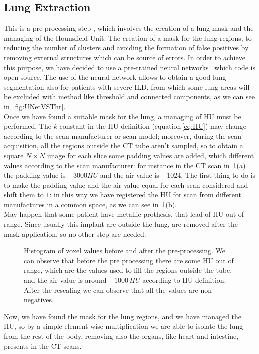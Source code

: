 \documentclass{standalone}
\begin{document}
	\subsection{Lung Extraction}
	This is a pre-processing step , which involves the creation of a lung mask and the managing of the Hounsfield Unit. The creation of a mask for the lung regions, to reducing the number of clusters and avoiding the formation of false positives by removing external structures which can be source of errors. In order to achieve this purpose, we have decided to use a pre-trained neural networks~\cite{REP:lungmask} which code is open source. The use of the neural network allows to obtain a good lung segmentation also for patients with severe ILD, from which some lung areas will be excluded with method like threshold and connected components, as we can see in \figurename\,\ref{fig:UNetVSThr}.\\
	
	Once we have found a suitable mask for the lung, a managing of HU must be performed. The $k$ constant in the HU definition (equation\,\ref{eq:HU}) may change according to the scan manufacturer or scan model; moreover, during the scan acquisition, all the regions outside the CT tube aren't sampled, so to obtain a square $N\times N$ image for each slice some padding values are added, which different values according to the scan manufacturer: for instance in the CT scan in \figurename\,\ref{fig:Pre-Processing}(a) the padding value is $-3000 HU$ and the air value is $-1024$. The first thing to do is to make the padding value and the air value equal for each scan considered and shift them to $1$: in this way we have registered the HU for scan from different manufactures in a common space, as we can see in \figurename\,\ref{fig:Pre-Processing}(b).\\ May happen that some patient have metallic prothesis, that lead of HU out of range. Since usually this implant are outside the lung, are removed after the mask application, so no other step are needed.\\
		\begin{figure}[h]
		\centering
		\caption{Histogram of voxel values before and after the pre-processing. We can observe that before the pre processing there are some HU out of range, which are the values used to fill the regions outside the tube, and the air value is around $-1000\,HU$ according to HU definition. After the rescaling we can observe that all the values are non-negatives.}\label{fig:Pre-Processing}
	\end{figure}
	Now, we have found the mask for the lung regions, and we have managed the HU, so by a simple element wise multiplication we are able to isolate the lung from the rest of the body, removing also the organs, like heart and intestine, presents in the CT scans.\\
	
\end{document}
